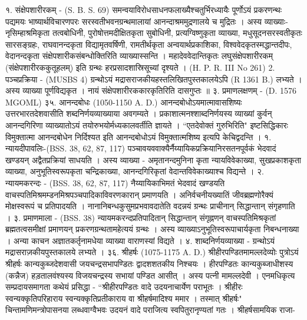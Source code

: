 १. संक्षेपशारीरकम् - (S. B. S. 69)
समन्वयाविरोधसाधनफलाख्यैश्चतुर्भिरध्यायैः पूर्णोऽयं प्रकरणन्थः पद्यमयः भाष्यार्थविचारणपरः सरस्वतीभवनग्रन्थमालायां आनन्दाश्रममुद्रणालये च मुद्रितः । अस्य व्याख्याः-नृसिम्हाश्रमिकृता तत्वबोधिनी, पुरोषोत्तमदीक्षितकृता सुबोधिनी, प्रत्यग्विष्णुकृता व्याख्या, मधुसूदनसरस्वतीकृतः सारसङ्ग्रहः, राघवानन्दकृता विद्यामृतवर्षिणी, रामतीर्थकृता अन्वयार्थप्रकाशिका, विश्ववेदकृतस्मद्धान्तदीपः, वेदानन्दकृता संक्षेपशारीकसंबन्धोक्तिरिति व्याख्यास्सन्ति । महादेववेदान्तिकृतः लघुसंक्षेपशारीरकम् (संक्षेपशारीरककुतूहलम्) इति ग्रन्थः हरप्रसादशास्रिसूच्यां दृश्यते । (H. P. R. III No 261)
2. पञ्चप्रक्रिया - (MUSBS 4)
ग्रन्थोऽयं मद्रासराजकीयहस्तलिखितपुस्तकालयेऽपि (R 1361 B.) लभ्यते । अस्य व्याख्या पूर्णविद्यकृत । नायं संक्षेपशारीरककारकृतिरिति दासगुप्तः ॥
३. प्रमाणलक्षणम् - (D. 1576 MGOML)
३५. आनन्दबोधः (1050-1150 A. D.)
आनन्दबोधोऽयमात्मावासशिष्यः उत्तरभारतदेशवासीति शब्दनिर्णयव्याख्याया अवगम्यते । प्रकाशात्मनश्शाब्दनिर्णयस्य व्याख्यां कुर्वन् आनन्दगिरिणा व्याख्यातोऽयं तयोरुभयोर्मध्यकालवर्तीति ज्ञायते । ``एतदेवोक्तं गुरुभिरिति" इष्टसिद्धिकारः विमुक्तात्मा आनन्दबोधेन निर्दिश्यत इति आनन्दबोधोऽयं विमुक्तात्मशिष्य इत्यपि केचिद्वदन्ति ।
१. न्यायदीपावलिः-(BSS. 38, 62, 87, 117)
पञ्चावयववाक्यैर्नैय्यायिकप्रक्रियानिरसतनपूर्वकं भेदवादं खण्डयन् अद्वैतप्रक्रियां साधयति । अस्य व्याख्या - अमृतानन्दमुनिना कृता न्यायविवेकाख्या, सुखप्रकाशकृता व्याख्या, अनुभूतिस्वरूपकृता चन्द्रिकाख्या, आनन्दगिरिकृतां वेदान्तविवेकाख्याश्च विद्यन्ते ।
२. न्यायमकरन्दः - (BSS. 38, 62, 87, 117)
नैय्यायिकाभिमतं भेदवादं खण्डयति वाचस्पतिमिश्रमम्डनमिश्रपञ्चपादिकाविवरणकारान् प्रमाणयति । अनिर्वचनीयख्यातिं जीवब्रह्मणोरैक्यं मोक्षस्वरूपं च प्रतिपादयति । नानानिबन्धकुसुमप्रभवावदातेति वदन्नयं ग्रन्थः प्राचीनान् सिद्धान्तान् संगृहणाति ।
३. प्रमाणमाला - (BSS. 38)
न्यायमकरन्दप्रतिपादितान् सिद्धान्तान् संगृह्नणन् वाचस्पतिमिश्रकृतां ब्रह्मतत्वसमीक्षां प्रमाणयन् प्रकरणग्रन्थतामहेत्ययं ग्रन्थः । अस्य व्याख्याऽनुभूतिस्वरूपाचार्यकृता निबन्धनाख्या । अन्या काचन अज्ञातकर्तृनामधेया व्याख्या वाराणस्यां विद्यते ।
४. शाब्दनिर्णयव्याख्या - ग्रन्थोऽयं मद्रासराज़कीयपुस्तकालये लभ्यते ।
३६. श्रीहर्षः (1075-1175 A. D.)
श्रीहीरपण्डितमामल्लदेव्योः पुत्रोऽयं श्रीहर्षः कान्यकुब्जदेशवासी जयचन्द्रसभापण्डितः द्वादशशतकीय निश्चयः ।
हीरपण्डितः कान्यकुब्जाधीशस्य (कन्नैज) हड़तालवंश्यस्य विजयचन्द्रस्य सभायां पण्डित आसीत् । अस्य पत्नी मामल्लदेवी । एनमधिकृत्य सम्प्रदायसमागता कथेयं प्रसिद्धा - ``श्रीहीरपण्डितः वादे उदयनाचार्येण पराभूतः । श्रीहीरः स्वन्यक्कृतिपरिहाराय स्वन्यक्कृतिप्रतीकाराय वा श्रीहर्षमादिश्य ममार । तस्मात् श्रीहर्षः" चिन्तामणिमन्त्रोपासनया लब्धवाग्वैभवः उदयनं वादे पराजित्य स्वपितुरानृण्यतां गतः ।
श्रीहर्षसामयिक राजा-
